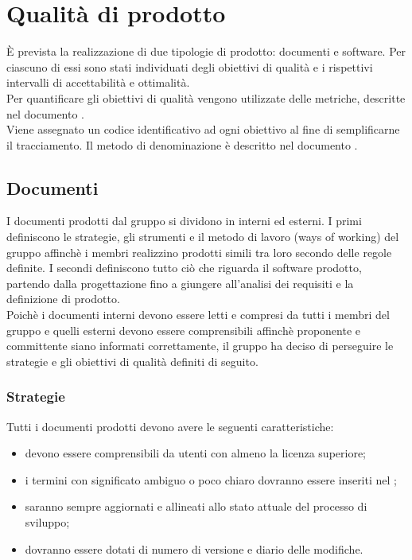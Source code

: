 \documentclass[PdQ.tex]{subfiles}
\begin{document}
\section{Qualità di prodotto}
	È prevista la realizzazione di due tipologie di prodotto: documenti e software. Per ciascuno di essi sono stati individuati
	degli obiettivi di qualità e i rispettivi intervalli di accettabilità e ottimalità. \\
	Per quantificare gli obiettivi di qualità vengono utilizzate delle metriche, descritte nel documento \NPdocRP{}. \\
	Viene assegnato un codice identificativo ad ogni obiettivo al fine di semplificarne il tracciamento. Il metodo di denominazione
	è descritto nel documento \NPdocRP{}.
	
	\subsection{Documenti}
		I documenti prodotti dal gruppo \GRUPPO{} si dividono in interni ed esterni. I primi definiscono le strategie, gli strumenti e il metodo di lavoro (ways of working)
		del gruppo affinchè i membri realizzino prodotti simili tra loro secondo delle regole definite. I secondi definiscono tutto ciò che riguarda il software prodotto,
		partendo dalla progettazione fino a giungere all'analisi dei requisiti e la definizione di prodotto. \\
		Poichè i documenti interni devono essere letti e compresi da tutti i membri del gruppo e quelli esterni devono essere comprensibili affinchè proponente e committente
		siano informati correttamente, il gruppo ha deciso di perseguire le strategie e gli obiettivi di qualità definiti di seguito.
	
		\subsubsection{Strategie}
		Tutti i documenti prodotti devono avere le seguenti caratteristiche:
		\begin{itemize}
			\item devono essere comprensibili da utenti con almeno la licenza superiore;
			\item i termini con significato ambiguo o poco chiaro dovranno essere inseriti nel \Gldoc{};
			\item saranno sempre aggiornati e allineati allo stato attuale del processo di sviluppo;
			\item dovranno essere dotati di numero di versione e diario delle modifiche.
		\end{itemize}
		
\end{document}
